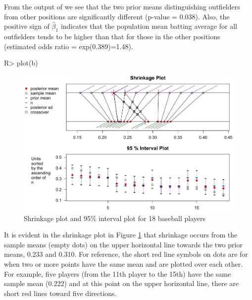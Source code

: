 \documentclass[article]{jss}
\begin{document}
From the output of  we see that the two prior means distinguishing outfielders from other positions are significantly different (p-value = 0.038). Also, the positive sign of $\hat{\beta}_{1}$ indicates that the population mean batting average for all outfielders tends to be higher than that for those in the other positions (estimated odds ratio = exp(0.389)=1.48).

\begin{CodeChunk}
\begin{CodeInput}
R> plot(b)
\end{CodeInput}
\end{CodeChunk}
\begin{figure}[h]
\begin{center}
\includegraphics[width = 6in]{baseball1.png}
\caption{Shrinkage plot and 95\% interval plot for 18 baseball players}
\label{fig:baseball}
\end{center}
\end{figure}

It is evident in the shrinkage plot in Figure \ref{fig:baseball} that shrinkage occurs from the sample means (empty dots) on the upper horizontal line towards the two prior means, 0.233 and 0.310. For reference, the short red line symbols on dots are for when two or more points have the same mean and are plotted over each other. For example, five players (from the 11th player to the 15th) have the same sample mean (0.222) and at this point on the upper horizontal line, there are short red lines toward five directions.

\end{document}
